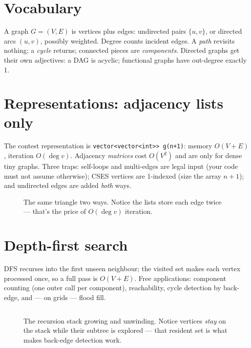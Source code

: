 \section{Vocabulary}\label{sec:vocab}
A graph $G = (V,E)$ is vertices plus edges: undirected pairs
$\{u,v\}$, or directed arcs $(u,v)$, possibly weighted. Degree counts
incident edges. A \emph{path} revisits nothing; a \emph{cycle}
returns; connected pieces are \emph{components}. Directed graphs get
their own adjectives: a DAG is acyclic; functional graphs have
out-degree exactly 1.

\section{Representations: adjacency lists only}\label{sec:repr}
The contest representation is \texttt{vector<vector<int>> g(n+1)}:
memory $O(V{+}E)$, iteration $O(\deg v)$. Adjacency \emph{matrices}
cost $O(V^2)$ and are only for dense tiny graphs. Three traps:
self-loops and multi-edges are legal input (your code must not assume
otherwise); CSES vertices are 1-indexed (size the array $n{+}1$); and
undirected edges are added \emph{both} ways.
\begin{figure}[ht]\centering

\caption{The same triangle two ways. Notice the lists store each edge
twice --- that's the price of $O(\deg v)$ iteration.}
\label{fig:adjlist}
\end{figure}

\section{Depth-first search}\label{sec:dfs}
DFS recurses into the first unseen neighbour; the visited set makes
each vertex processed once, so a full pass is $O(V{+}E)$. Free
applications: component counting (one outer call per component),
reachability, cycle detection by back-edge, and --- on grids ---
flood fill.
\begin{lstlisting}[language=C++,caption={\texttt{dfs.h}: the five-line
idiom.},label={lst:dfs}]
\end{lstlisting}

\begin{figure}[ht]\centering

\caption{The recursion stack growing and unwinding. Notice vertices
\emph{stay} on the stack while their subtree is explored --- that
resident set is what makes back-edge detection work.}
\label{fig:dfsstack}
\end{figure}

